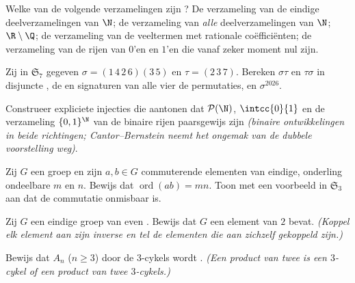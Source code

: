 \begin{exercise}[$\star$]\label{exo:b2:structures:1}
Welke van de volgende verzamelingen zijn ? De verzameling
van de eindige deelverzamelingen van $\N$; de verzameling van
\emph{alle} deelverzamelingen van $\N$; $\R \setminus \Q$; de
verzameling van de veeltermen met rationale coëfficiënten; de
verzameling van de rijen van $0$'en en $1$'en die vanaf zeker
moment nul zijn.
\end{exercise}

\begin{exercise}[$\star$]\label{exo:b2:structures:2}
Zij in $\mathfrak{S}_7$ gegeven $\sigma = (1\,4\,2\,6)(3\,5)$ en
$\tau = (2\,3\,7)$. Bereken $\sigma\tau$ en $\tau\sigma$ in
disjuncte , de  en signaturen van alle vier de
permutaties, en $\sigma^{2026}$.
\end{exercise}

\begin{exercise}[$\star$]\label{exo:b2:structures:3}
Construeer expliciete injecties die aantonen dat
$\mathcal{P}(\N)$, $\intcc{0}{1}$ en de verzameling $\{0,1\}^{\N}$
van de binaire rijen paarsgewijs  zijn \emph{(binaire
ontwikkelingen in beide richtingen; Cantor--Bernstein neemt het
ongemak van de dubbele voorstelling weg)}.
\end{exercise}

\begin{exercise}[$\star$]\label{exo:b2:structures:4}
Zij $G$ een groep en zijn $a, b \in G$ commuterende elementen van
eindige, onderling ondeelbare  $m$ en $n$. Bewijs dat
$\operatorname{ord}(ab) = mn$. Toon met een voorbeeld in
$\mathfrak{S}_3$ aan dat de commutatie onmisbaar is.
\end{exercise}

\begin{exercise}[$\star\star$]\label{exo:b2:structures:5}
Zij $G$ een eindige groep van even . Bewijs dat $G$ een
element van  $2$ bevat. \emph{(Koppel elk element aan zijn
inverse en tel de elementen die aan zichzelf gekoppeld zijn.)}
\end{exercise}

\begin{exercise}[$\star\star$]\label{exo:b2:structures:6}
Bewijs dat $A_n$ ($n \geq 3$) door de $3$-cykels wordt
. \emph{(Een product van twee  is een
$3$-cykel of een product van twee $3$-cykels.)}
\end{exercise}


